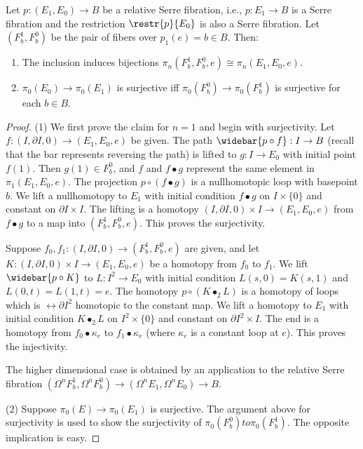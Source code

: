 \begin{prop}\label{prop 6.3.8 tomDieck}
    Let $p:(E_1,E_0)\to B$ be a relative Serre fibration, i.e., $p:E_1\to B$ is a Serre fibration and the restriction $\restr{p}{E_0}$ is also a Serre fibration. Let $(F^1_b,F^0_b)$ be the pair of fibers over $p_1(e)=b\in B$. Then:
    \begin{enumerate}
        \item The inclusion induces bijections $\pi_n(F_b^1,F_b^0,e)\cong\pi_n(E_1,E_0,e)$.
        \item $\pi_0(E_0)\to \pi_0(E_1)$ is surjective iff $\pi_0(F_b^0)\to \pi_0(F_b^1)$ is surjective for each $b\in B$.
    \end{enumerate}
\end{prop}
\begin{proof}
    (1) We first prove the claim for $n=1$ and begin with surjectivity. Let $f:(I,\partial I,0)\to (E_1,E_0,e)$ be given. The path $\widebar{p\circ f}:I\to B$ (recall that the bar represents reversing the path) is lifted to $g:I\to E_0$ with initial point $f(1)$. Then $g(1)\in F^0_b$, and $f$ and $f\bullet g$ represent the same element in $\pi_1(E_1,E_0,e)$. The projection $p\circ(f\bullet g)$ is a nullhomotopic loop with basepoint $b$. We lift a nullhomotopy to $E_1$ with initial condition $f\bullet g$ on $I\times\{0\}$ and constant on $\partial I\times I$. The lifting is a homotopy $(I,\partial I,0)\times I\to (E_1,E_0,e)$ from $f\bullet g$ to a map into $(F^1_b,F^0_b,e)$. This proves the surjectivity.

    Suppose $f_0,f_1:(I,\partial I,0)\to (F^1_b,F^0_b,e)$ are given, and let $K:(I,\partial I,0)\times I\to (E_1,E_0,e)$ be a homotopy from $f_0$ to $f_1$. We lift $\widebar{p\circ K}$ to $L:I^2\to E_0$ with initial condition $L(s,0)=K(s,1)$ and $L(0,t)=L(1,t)=e$. The homotopy $p\circ(K\bullet_2 L)$ is a homotopy of loops which is $\rel \partial I^2$ homotopic to the constant map. We lift a homotopy to $E_1$ with initial condition $K\bullet_2 L$ on $I^2\times\{0\}$ and constant on $\partial I^2\times I$. The end is a homotopy from $f_0\bullet \kappa_e$ to $f_1\bullet\kappa_e$ (where $\kappa_e$ is a constant loop at $e$). This proves the injectivity.

    The higher dimensional case is obtained by an application to the relative Serre fibration $(\Omega^n F^1_b,\Omega^n F^0_b)\to (\Omega^n E_1,\Omega^nE_0)\to B$.

    (2) Suppose $\pi_0(E)\to \pi_0(E_1)$ is surjective. The argument above for surjectivity is used to show the surjectivity of $\pi_0(F^0_b)
    to \pi_0(F^1_b)$. The opposite implication is easy.
\end{proof}





